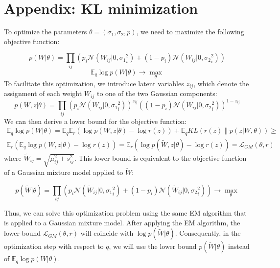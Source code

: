 \documentclass{article}
\newcommand{\N}{\mathcal{N}}
\newcommand{\E}{\mathbb{E}}
\renewcommand{\L}{\mathcal{L}}
\begin{document}
\section{Appendix: KL minimization}

To optimize the parameters $\theta = (\sigma_1, \sigma_2, p)$, we need to maximize the following objective function:

\begin{equation}
    p(W|\theta) = \prod_{ij} \left( p_i\N(W_{ij}|0, {\sigma_1}_i^2) + (1 - p_i)\N(W_{ij}|0, {\sigma_2}_i^2)\right)
\end{equation}
\begin{equation}
    \E_q \log p(W|\theta) \to \max_{\theta}
\end{equation}
To facilitate this optimization, we introduce latent variables $z_{ij}$, which denote the assignment of each weight $W_{ij}$ to one of the two Gaussian components:
\begin{equation}
    p(W, z | \theta) = \prod_{ij} \left(p_i\N(W_{ij}|0, {\sigma_1}_i^2)\right)^{z_{ij}}\left((1 - p_i)\N(W_{ij}|0, {\sigma_2}_i^2)\right)^{1 - z_{ij}}
\end{equation}
We can then derive a lower bound for the objective function:
\begin{multline}
    \E_q \log p(W|\theta) =
    \E_q \E_r \left( \log p(W, z|\theta) - \log r(z) \right) + \E_q KL(r(z) \| p(z|W, \theta)) \ge \\
    \E_r \left( \E_q \log p(W, z|\theta) - \log r(z) \right) =
    \E_r \left( \log p(\tilde{W}, z|\theta) - \log r(z) \right) = \L_{GM}(\theta, r)
\end{multline}
where $\tilde{W}_{ij} = \sqrt{\mu_{ij}^2 + s_{ij}^2}$. This lower bound is equivalent to the objective function of a Gaussian mixture model applied to $\tilde{W}$:

\begin{equation}
    p(\tilde{W}|\theta) = \prod_{ij} \left( p_i\N(\tilde{W}_{ij}|0, {\sigma_1}_i^2) + (1 - p_i)\N(\tilde{W}_{ij}|0, {\sigma_2}_i^2)\right) \to \max_{\theta}
\end{equation}

Thus, we can solve this optimization problem using the same EM algorithm that is applied to a Gaussian mixture model. After applying the EM algorithm, the lower bound $\L_{GM}(\theta, r)$ will coincide with $\log p(\tilde{W}|\theta)$. Consequently, in the optimization step with respect to $q$, we will use the lower bound $p(\tilde{W}|\theta)$ instead of $\E_q \log p(W|\theta)$.
\end{document}
